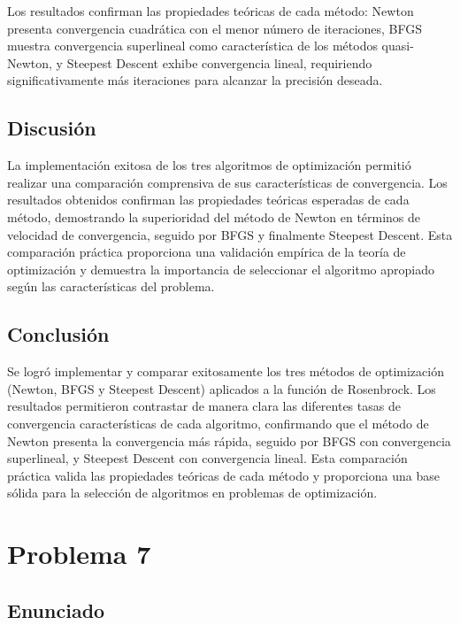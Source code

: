 \documentclass{article}
\begin{document}
Los resultados confirman las propiedades teóricas de cada método: Newton presenta convergencia cuadrática con el menor número de iteraciones, BFGS muestra convergencia superlineal como característica de los métodos quasi-Newton, y Steepest Descent exhibe convergencia lineal, requiriendo significativamente más iteraciones para alcanzar la precisión deseada.

\subsection{Discusión}

La implementación exitosa de los tres algoritmos de optimización permitió realizar una comparación comprensiva de sus características de convergencia. Los resultados obtenidos confirman las propiedades teóricas esperadas de cada método, demostrando la superioridad del método de Newton en términos de velocidad de convergencia, seguido por BFGS y finalmente Steepest Descent. Esta comparación práctica proporciona una validación empírica de la teoría de optimización y demuestra la importancia de seleccionar el algoritmo apropiado según las características del problema.

\subsection{Conclusión}

Se logró implementar y comparar exitosamente los tres métodos de optimización (Newton, BFGS y Steepest Descent) aplicados a la función de Rosenbrock. Los resultados permitieron contrastar de manera clara las diferentes tasas de convergencia características de cada algoritmo, confirmando que el método de Newton presenta la convergencia más rápida, seguido por BFGS con convergencia superlineal, y Steepest Descent con convergencia lineal. Esta comparación práctica valida las propiedades teóricas de cada método y proporciona una base sólida para la selección de algoritmos en problemas de optimización.

\section{Problema 7}

\subsection{Enunciado}
\end{document}
